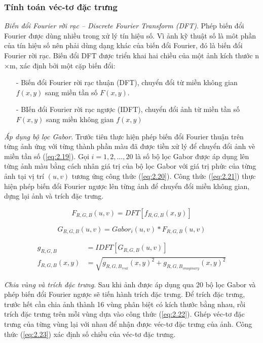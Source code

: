 \subsubsection{Tính toán véc-tơ đặc trưng}
\emph{Biến đổi Fourier rời rạc  -- Discrete Fourier Transform (DFT)}.
Phép biến đổi Fourier được dùng nhiều trong xử lý tín hiệu số. Vì ảnh kỹ thuật số là môt phần của tín hiệu số nên phải dùng dạng khác của biến đổi Fourier, đó là biến đổi Fourier rời rạc. Biến đổi DFT được triển khai hai chiều của một ảnh kích thước n$\times$m, xác định bởi một cặp biến đổi:
\begin{itemize}
\item[-] Biến đổi Fourier rời rạc thuận (DFT), chuyển đổi từ miền không gian $f(x,y)$ sang miền tần số $F(x,y)$.
\item[-] BIến đổi Fourier rời rạc ngược (IDFT), chuyển đổi ảnh từ miền tần số $F(x,y)$ sang miền không gian $f(x,y)$
\end{itemize}

\emph{Áp dụng bộ lọc Gabor}.
Trước tiên thực hiện phép biến đổi Fourier thuận trên từng ảnh ứng với từng thành phần màu đã được tiền xử lý để chuyển đổi ảnh vè miền tần số (\ref{eq:2.19}). Gọi $i = 1, 2, \dots, 20$ là số bộ lọc Gabor được áp dụng lên từng ảnh màu bằng cách nhân giá trị của bộ lọc Gabor với giá trị phức của từng ảnh tại vị trí $(u,v)$ tương ứng công thức (\ref{eq:2.20}). Công thức (\ref{eq:2.21}) thực hiện phép biến đổi Fourier ngược lên từng ảnh để chuyển đổi miền không gian, dựng lại ảnh và trích đặc trưng. \par

\begin{equation}\label{eq:2.19}
F_{R, G, B}(u, v) = DFT[f_{R, G, B}(x,y)]
\end{equation}

\begin{equation}\label{eq:2.20}
G_{R, G, B}(u,v) = Gabor_i(u, v) * F_{R, G, B}(u, v)
\end{equation}

\begin{equation}\label{eq:2.21}
\begin{split}
g_{R, G, B} &= IDFT[G_{R, G, B}(u,v)]\\
f_{R, G, B}(x, y) & = \sqrt{g_{R, G, B_{real}}(x, y)^2 + g_{R, G, B_{imaginary}}(x, y)^2}
\end{split}
\end{equation}


\emph{Chia vùng và trích đặc trưng}. 
Sau khi ảnh được áp dụng qua 20 bộ lọc Gabor và phép biến đổi Fourier ngược sẽ tiến hành trích đặc trưng. Để trích đặc trưng, trước hết cần chia ảnh thành 16 vùng phân biệt có kích thước bằng nhau, rồi trích đặc trưng trên mỗi vùng dựa vào công thức (\ref{eq:2.22}). Ghép véc-tơ đặc trưng của từng vùng lại với nhau để nhận được véc-tơ đặc trưng của ảnh. Công thức (\ref{eq:2.23}) xác định số chiều của véc-tơ đặc trưng.

